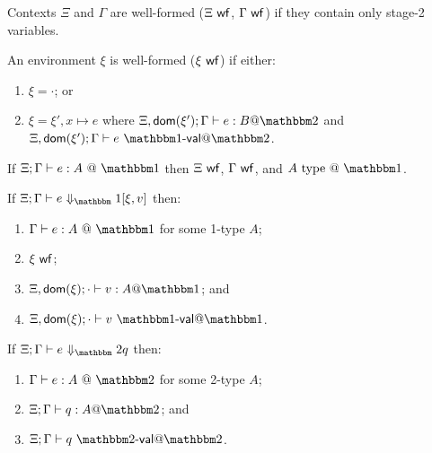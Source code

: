 \begin{definition}
Contexts $\Xi$ and $\Gamma$ are well-formed ($\Xi\ \mathsf{wf}$, $\Gamma\ \mathsf{wf}$) if they
contain only stage-2 variables.
\end{definition}

\begin{definition}
An environment $\xi$ is well-formed ($\xi\ \mathsf{wf}$) if either:
\begin{enumerate}
\item $\xi = \cdot$; or
\item $\xi = \xi',x\mapsto e$ where
$\Xi,\dom{\xi'};\Gamma\vdash e : B @ \bbtwo$ and
$\Xi,\dom{\xi'};\Gamma\vdash e \valot$.
\end{enumerate}
\end{definition}

\begin{theorem}
If $\Xi;\typesone e A$ then $\Xi\ \mathsf{wf}$, $\Gamma\ \mathsf{wf}$, and $A\istypeone$.
\end{theorem}

\begin{theorem}
If $\diaonesub$ then:
\begin{enumerate}
\item $\typesone e A$ for some 1-type $A$;
\item $\xi\ \mathsf{wf}$;
\item $\Xi,\dom\xi;\cdot\vdash v : A @ \bbone$; and
\item $\Xi,\dom\xi;\cdot\vdash v\valoo$.
\end{enumerate}
\end{theorem}

\begin{theorem}
If $\diatwosub$ then:
\begin{enumerate}
\item $\typestwo e A$ for some 2-type $A$;
\item $\Xi;\Gamma\vdash q : A @ \bbtwo$; and
\item $\Xi;\Gamma\vdash q\valtt$.
\end{enumerate}
\end{theorem}


